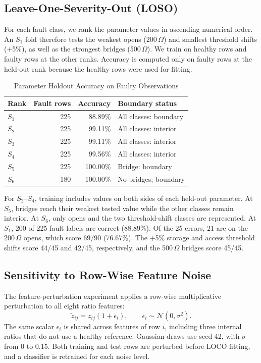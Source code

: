 \documentclass[conference]{IEEEtran}
\begin{document}
\subsection{Leave-One-Severity-Out (LOSO)}
\label{sec:loso}
For each fault class, we rank the parameter values in ascending numerical order. An $S_1$ fold therefore tests the weakest opens (200\,$\Omega$) and smallest threshold shifts (+5\%), as well as the strongest bridges (500\,$\Omega$). We train on healthy rows and faulty rows at the other ranks. Accuracy is computed only on faulty rows at the held-out rank because the healthy rows were used for fitting.

\begin{table}[t]
\centering
\caption{Parameter Holdout Accuracy on Faulty Observations}
\label{tab:loso_master}
\begin{tabular}{lrrl}
\toprule
Rank & Fault rows & Accuracy & Boundary status\\
\midrule
$S_1$ & 225 & 88.89\% & All classes: boundary\\
$S_2$ & 225 & 99.11\% & All classes: interior\\
$S_3$ & 225 & 99.11\% & All classes: interior\\
$S_4$ & 225 & 99.56\% & All classes: interior\\
$S_5$ & 225 & 100.00\% & Bridge: boundary\\
$S_6$ & 180 & 100.00\% & No bridges; boundary\\
\bottomrule
\end{tabular}
\end{table}

For $S_2$--$S_4$, training includes values on both sides of each held-out parameter. At $S_5$, bridges reach their weakest tested value while the other classes remain interior. At $S_6$, only opens and the two threshold-shift classes are represented. At $S_1$, 200 of 225 fault labels are correct (88.89\%). Of the 25 errors, 21 are on the 200\,$\Omega$ opens, which score 69/90 (76.67\%). The +5\% storage and access threshold shifts score 44/45 and 42/45, respectively, and the 500\,$\Omega$ bridges score 45/45.

\subsection{Sensitivity to Row-Wise Feature Noise}
\label{sec:tolerance}
The feature-perturbation experiment applies a row-wise multiplicative perturbation to all eight ratio features:
\begin{equation}
\widetilde z_{ij}=z_{ij}(1+\epsilon_i),\qquad
\epsilon_i\sim\mathcal N(0,\sigma^2).
\end{equation}
The same scalar $\epsilon_i$ is shared across features of row $i$, including three internal ratios that do not use a healthy reference. Gaussian draws use seed 42, with $\sigma$ from 0 to 0.15. Both training and test rows are perturbed before LOCO fitting, and a classifier is retrained for each noise level.
\end{document}
